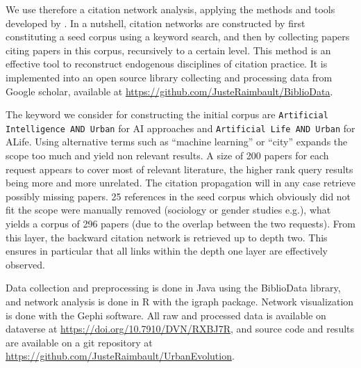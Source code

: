 \documentclass[10pt]{article}
\begin{document}
We use therefore a citation network analysis, applying the methods and tools developed by \cite{raimbault2019exploration}. In a nutshell, citation networks are constructed by first constituting a seed corpus using a keyword search, and then by collecting papers citing papers in this corpus, recursively to a certain level. This method is an effective tool to reconstruct endogenous disciplines of citation practice. It is implemented into an open source library collecting and processing data from Google scholar, available at \url{https://github.com/JusteRaimbault/BiblioData}.


The keyword we consider for constructing the initial corpus are \texttt{Artificial Intelligence AND Urban} for AI approaches and \texttt{Artificial Life AND Urban} for ALife. Using alternative terms such as ``machine learning'' or ``city'' expands the scope too much and yield non relevant results. A size of 200 papers for each request appears to cover most of relevant literature, the higher rank query results being more and more unrelated. The citation propagation will in any case retrieve possibly missing papers. 25 references in the seed corpus which obviously did not fit the scope were manually removed (sociology or gender studies e.g.), what yields a corpus of 296 papers (due to the overlap between the two requests). From this layer, the backward citation network is retrieved up to depth two. This ensures in particular that all links within the depth one layer are effectively observed.



Data collection and preprocessing is done in Java using the BiblioData library, and network analysis is done in R with the igraph package. Network visualization is done with the Gephi software. All raw and processed data is available on dataverse at \url{https://doi.org/10.7910/DVN/RXBJ7R}, and source code and results are available on a git repository at \url{https://github.com/JusteRaimbault/UrbanEvolution}.

\end{document}
